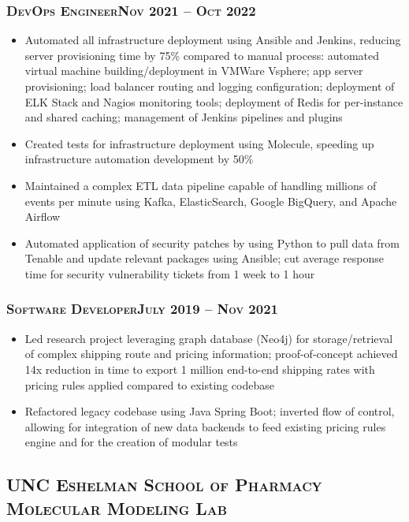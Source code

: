 \documentclass{article}
\newcommand{\institution}[1]{\subsection*{\scshape{#1}}}
\newcommand{\jobPosition}[3]{\subsubsection*{\scshape{#1}\hfill #2 -- #3}}
\begin{document}
    \jobPosition{DevOps Engineer}{Nov 2021}{Oct 2022}
    \begin{itemize}[noitemsep]
      \item
            Automated all infrastructure deployment using Ansible and
            Jenkins, reducing server provisioning time by 75\% compared to manual
            process: automated virtual machine building/deployment in VMWare
            Vsphere; app server provisioning; load balancer routing and logging
            configuration; deployment of ELK Stack and Nagios monitoring tools;
            deployment of Redis for per-instance and shared caching; management of
            Jenkins pipelines and plugins
      \item
            Created tests for infrastructure deployment using Molecule,
            speeding up infrastructure automation development by 50\%
      \item
            Maintained a complex ETL data pipeline capable of handling
            millions of events per minute using Kafka, ElasticSearch, Google BigQuery,
            and Apache Airflow
      \item
            Automated application of security patches by using Python to
            pull data from Tenable and update relevant packages using Ansible; cut
            average response time for security vulnerability tickets from 1 week to
            1 hour
    \end{itemize}

    \jobPosition{Software Developer}{July 2019}{Nov 2021}
    \begin{itemize}[noitemsep]
      \item
            Led research project leveraging graph database (Neo4j) for
            storage/retrieval of complex shipping route and pricing information;
            proof-of-concept achieved 14x reduction in time to export 1 million
            end-to-end shipping rates with pricing rules applied compared to
            existing codebase
      \item
            Refactored legacy codebase using Java Spring Boot; inverted
            flow of control, allowing for integration of new data backends
            to feed existing pricing rules engine and for the creation of modular
            tests
    \end{itemize}

  \institution{UNC Eshelman School of Pharmacy Molecular Modeling Lab}
\end{document}
